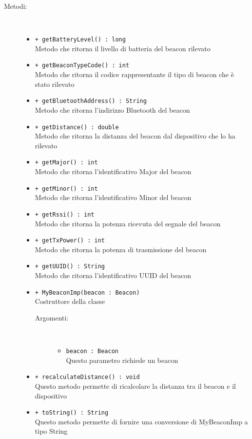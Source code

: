 \documentclass[../DefinizioneDiProdotto.tex]{subfiles}
\begin{document}
\begin{description}
\begin{itemize}
\end{itemize}
\item[Metodi:] \
\begin{itemize}
\item \texttt{+ getBatteryLevel() : long}\\
Metodo che ritorna il livello di batteria del beacon rilevato
 \item \texttt{+ getBeaconTypeCode() : int}\\
Metodo che ritorna il codice rappresentante il tipo di beacon che è stato rilevato
 \item \texttt{+ getBluetoothAddress() : String}\\
Metodo che ritorna l'indirizzo Bluetooth del beacon
 \item \texttt{+ getDistance() : double}\\
Metodo che ritorna la distanza del beacon dal dispositivo che lo ha rilevato
 \item \texttt{+ getMajor() : int}\\
Metodo che ritorna l'identificativo Major del beacon
 \item \texttt{+ getMinor() : int}\\
Metodo che ritorna l'identificativo Minor del beacon
 \item \texttt{+ getRssi() : int}\\
Metodo che ritorna la potenza ricevuta del segnale del beacon
 \item \texttt{+ getTxPower() : int}\\
Metodo che ritorna la potenza di trasmissione del beacon
 \item \texttt{+ getUUID() : String}\\
Metodo che ritorna l'identificativo UUID del beacon
 \item \texttt{+ MyBeaconImp(beacon : Beacon)}\\
Costruttore della classe
 \begin{description}
\item[Argomenti:] \
\begin{itemize}
\item \texttt{beacon : Beacon}\\
Questo parametro richiede un beacon\end{itemize}
\end{description}
\item \texttt{+ recalculateDistance() : void}\\
Questo metodo permette di ricalcolare la distanza tra il beacon e il dispositivo
 \item \texttt{+ toString() : String}\\
Questo metodo permette di fornire una conversione di MyBeaconImp a tipo String
 \end{itemize}
\end{description}
\end{document}
